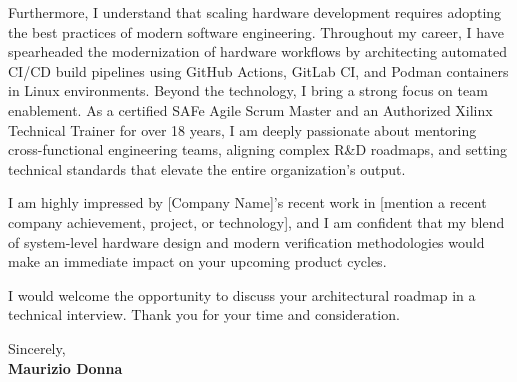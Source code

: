 \documentclass[11pt, letterpaper]{article}
\begin{document}
Furthermore, I understand that scaling hardware development requires adopting the best practices of modern software engineering. Throughout my career, I have spearheaded the modernization of hardware workflows by architecting automated CI/CD build pipelines using GitHub Actions, GitLab CI, and Podman containers in Linux environments. Beyond the technology, I bring a strong focus on team enablement. As a certified SAFe Agile Scrum Master and an Authorized Xilinx Technical Trainer for over 18 years, I am deeply passionate about mentoring cross-functional engineering teams, aligning complex R\&D roadmaps, and setting technical standards that elevate the entire organization's output.

I am highly impressed by [Company Name]'s recent work in [mention a recent company achievement, project, or technology], and I am confident that my blend of system-level hardware design and modern verification methodologies would make an immediate impact on your upcoming product cycles. 

I would welcome the opportunity to discuss your architectural roadmap in a technical interview. Thank you for your time and consideration.

\vspace{2em}

\noindent
Sincerely,\\[2em]
\textbf{Maurizio Donna}
\end{document}
